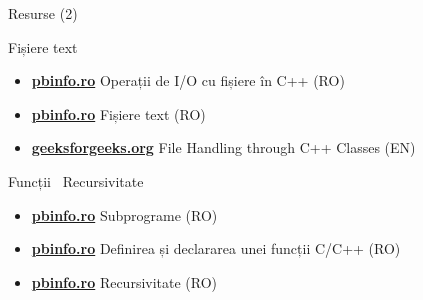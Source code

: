 \documentclass{beamer}
\begin{document}
\begin{frame}{Resurse (2)}
  \begin{block}{Fișiere text}
    \begin{itemize}\footnotesize\itemsep0pt
      \item \href{https://www.pbinfo.ro/articole/19047/operatii-de-intrare-iesire-cu-fisiere-in-cpp}{\textbf{pbinfo.ro}} \textemdash{} Operații de I/O cu fișiere în C++ (RO)
      \item \href{https://www.pbinfo.ro/articole/2673/fisiere-text}{\textbf{pbinfo.ro}} \textemdash{} Fișiere text (RO)
      \item \href{https://www.geeksforgeeks.org/cpp/file-handling-through-c-classes/}{\textbf{geeksforgeeks.org}} \textemdash{} File Handling through C++ Classes (EN)
    \end{itemize}
  \end{block}
  \vspace{-6pt}
  \begin{block}{Funcții \textbar\ Recursivitate}
    \begin{itemize}\footnotesize\itemsep0pt
      \item \href{https://www.pbinfo.ro/articole/3656/subprograme}{\textbf{pbinfo.ro}} \textemdash{} Subprograme (RO)
      \item \href{https://www.pbinfo.ro/articole/3664/definirea-si-declararea-unei-functii-c-c}{\textbf{pbinfo.ro}} \textemdash{} Definirea și declararea unei funcții C/C++ (RO)
      \item \href{https://www.pbinfo.ro/articole/3873/recursivitate}{\textbf{pbinfo.ro}} \textemdash{} Recursivitate (RO)
    \end{itemize}
  \end{block}
\end{frame}
\end{document}
